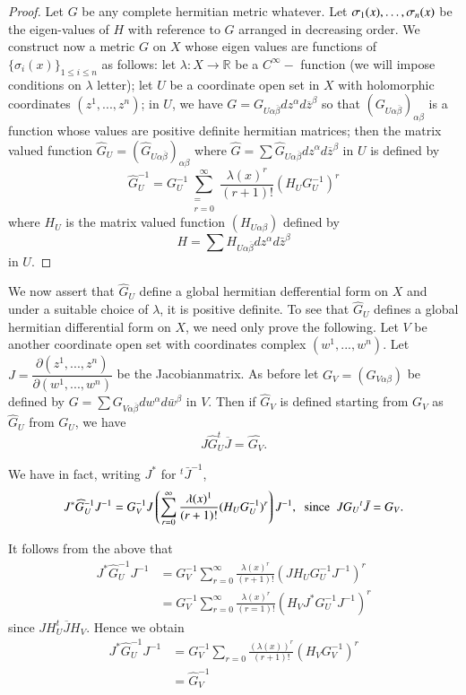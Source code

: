 \begin{proof}
  Let $G$ be any complete hermitian metric whatever. Let
  $\sigma_1(x),\ldots,\break\sigma_n(x)$ be the eigen-values of $H$ with
  reference to $G$ arranged in decreasing order. We construct now a
  metric $G$ on $X$ whose eigen values are functions of $
  {\big\{\sigma_i(x)\big\}_{1 \le i \le n}}$ as follows: let $
  {\lambda : X \to  \mathbb{R}}$ be a ${C^\infty-}$
  function (we will impose conditions on $\lambda$ letter); let $U$ be
  a  coordinate open set in $X$ with holomorphic coordinates
  $(z^1,...,z^n)$; in $U$, we have $G=G_{U \alpha 
      \overline{\beta}} dz^\alpha d\overline{z}^{\beta}$  so that $(G_{U
      \alpha \overline{\beta}})_{\alpha \beta}$ is a function whose
  values are positive definite hermitian matrices; then the matrix
  valued function ${\widehat{G}_U=(\widehat{G}_{U \alpha
      \overline{\beta}})_{\alpha \beta}}$ where $
  {\widehat{G}=\sum\widehat{G}_{U \alpha
      \overline{\beta}}dz^\alpha d\overline{z}^\beta }$ in $U$ is
  defined by  
  $$
  {\widehat{G}^{-1}_U = G^{-1}_U  \displaystyle\sum^\infty_{\substack{=
        \\ r=0}} \frac{\lambda (x)^r}{(r+1) !}(H_U G^{-1}_U)^r}
  $$ 
  where $H_U$ is the matrix valued function $(H_{U \alpha
      \beta})$ defined by  
  $$
  H=\sum H_{U \alpha \overline{\beta}}dz^\alpha d\bar{z}^\beta 
  $$
  in $U$.
\end{proof}

We now assert that $\widehat{G}_U$ define a global hermitian
defferential form on $X$ and under a suitable choice of $\lambda$, it is
positive definite. To see that $\widehat{G}_U$ defines a global
hermitian differential form on $X$, we need only prove the
following. Let $V$ be another coordinate open set with coordinates
complex $(w^1,...,w^n)$. Let
$J=\dfrac{\partial(z^1,...,z^n)}{\partial(w^1,...,w^n)}$ be the    
Jacobian\pageoriginale matrix. As before let $G_V = (G_{V \alpha
  \beta})$ be defined by $G=\sum G_{V \alpha \overline{\beta}}
dw^\alpha d \bar{w}^\beta$ in $V$. Then if $\widehat{G}_V$ is defined
starting from $G_V$ as  $\widehat{G}_U$ from $G_U$, we have  
$$
J\widehat{G}_U^t \overline{J}=\widehat{G_V}.
$$

We have in fact, writing $J^*$ for ${}^t {\bar{J}}^{-1}$,
$$
J^* {\widehat{G}}_U^{-1} J^{-1} = G^{-1}_V J \left(\sum\limits_{r=0}^{\infty}
\frac{\lambda(x)^1}{(r+1)!}(H_U G^{-1}_U)^r\right)J^{-1}, \; ~ {\rm
  since} ~ \; J G_U {}^{t}\bar{J} = G_V.
$$

It follows from the above that
\begin{align*}
  J^* \widehat{G}_U^{-1} J^{-1} & = G_V^{-1} \sum\limits_{r=0}^\infty
  \frac{\lambda(x)^r}{(r+1)!}  (J  H_U  G_U^{-1}  J^{-1})^r \\
    &= G_V^{-1} \sum\limits_{r=0}^\infty
  \frac{\lambda(x)^r}{(r=1)!}(H_V J^* G_U^{-1} J^{-1})^r 
  \end{align*}
since $J H_U^t \overline{J}H_V$. Hence we obtain
\begin{align*}
  J^*\widehat{G}_U^{-1} J^{-1} & =G_V^{-1} \sum\limits_{r=0}
  \frac{(\lambda(x))^r}{(r+1)!} (H_V G_V^{-1})^r\\ 
  &= \widehat{G}_V^{-1}
\end{align*}

